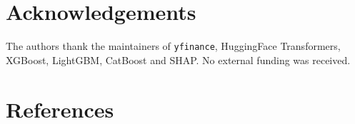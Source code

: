 \documentclass[12pt,a4paper]{article}
\begin{document}
\section{Acknowledgements}

The authors thank the maintainers of \texttt{yfinance}, HuggingFace Transformers,
XGBoost, LightGBM, CatBoost and SHAP. No external funding was received.

\section{References}
\renewcommand{\refname}{}
\vspace{-2\baselineskip}
\end{document}
